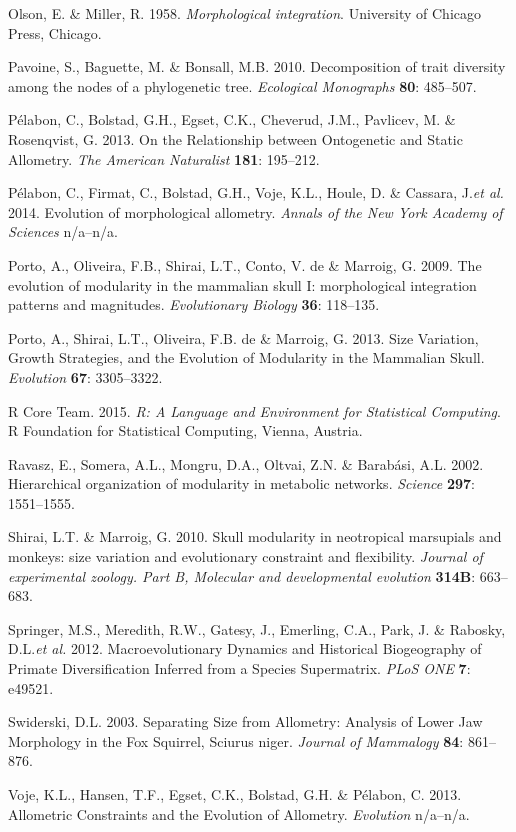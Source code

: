 \documentclass[11pt,twoside]{report}
\begin{document}
Olson, E. \& Miller, R. 1958. \emph{Morphological integration}.
University of Chicago Press, Chicago.

Pavoine, S., Baguette, M. \& Bonsall, M.B. 2010. Decomposition of trait
diversity among the nodes of a phylogenetic tree. \emph{Ecological
Monographs} \textbf{80}: 485--507.

Pélabon, C., Bolstad, G.H., Egset, C.K., Cheverud, J.M., Pavlicev, M. \&
Rosenqvist, G. 2013. On the Relationship between Ontogenetic and Static
Allometry. \emph{The American Naturalist} \textbf{181}: 195--212.

Pélabon, C., Firmat, C., Bolstad, G.H., Voje, K.L., Houle, D. \&
Cassara, J.\emph{et al.} 2014. Evolution of morphological allometry.
\emph{Annals of the New York Academy of Sciences} n/a--n/a.

Porto, A., Oliveira, F.B., Shirai, L.T., Conto, V. de \& Marroig, G.
2009. The evolution of modularity in the mammalian skull I:
morphological integration patterns and magnitudes. \emph{Evolutionary
Biology} \textbf{36}: 118--135.

Porto, A., Shirai, L.T., Oliveira, F.B. de \& Marroig, G. 2013. Size
Variation, Growth Strategies, and the Evolution of Modularity in the
Mammalian Skull. \emph{Evolution} \textbf{67}: 3305--3322.

R Core Team. 2015. \emph{R: A Language and Environment for Statistical
Computing}. R Foundation for Statistical Computing, Vienna, Austria.

Ravasz, E., Somera, A.L., Mongru, D.A., Oltvai, Z.N. \& Barabási, A.L.
2002. Hierarchical organization of modularity in metabolic networks.
\emph{Science} \textbf{297}: 1551--1555.

Shirai, L.T. \& Marroig, G. 2010. Skull modularity in neotropical
marsupials and monkeys: size variation and evolutionary constraint and
flexibility. \emph{Journal of experimental zoology. Part B, Molecular
and developmental evolution} \textbf{314B}: 663--683.

Springer, M.S., Meredith, R.W., Gatesy, J., Emerling, C.A., Park, J. \&
Rabosky, D.L.\emph{et al.} 2012. Macroevolutionary Dynamics and
Historical Biogeography of Primate Diversification Inferred from a
Species Supermatrix. \emph{PLoS ONE} \textbf{7}: e49521.

Swiderski, D.L. 2003. Separating Size from Allometry: Analysis of Lower
Jaw Morphology in the Fox Squirrel, Sciurus niger. \emph{Journal of
Mammalogy} \textbf{84}: 861--876.

Voje, K.L., Hansen, T.F., Egset, C.K., Bolstad, G.H. \& Pélabon, C.
2013. Allometric Constraints and the Evolution of Allometry.
\emph{Evolution} n/a--n/a.
\end{document}
